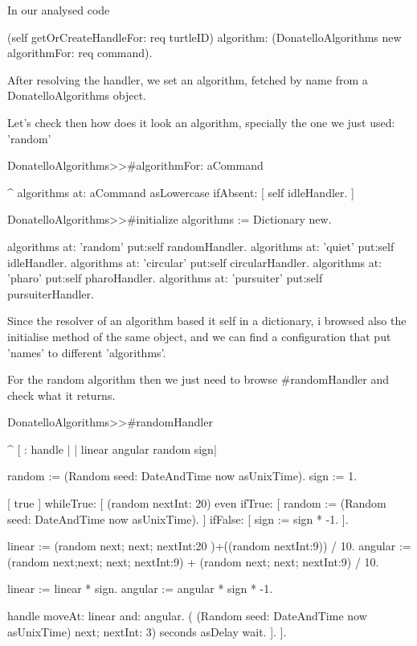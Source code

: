 \documentclass[a4paper,10pt,twoside]{book}
\begin{document}
			
			In our analysed code 
			
			\begin{code}
				(self getOrCreateHandleFor: req turtleID)  algorithm: (DonatelloAlgorithms new algorithmFor: req command).
			\end{code}
			
			After resolving the handler, we set an algorithm, fetched by name from a DonatelloAlgorithms object. 
			
			Let's check then how does it look an algorithm, specially the one we just used: 'random' 
			
			
			\begin{code}
DonatelloAlgorithms>>#algorithmFor: aCommand
	
	^ algorithms at: aCommand asLowercase  ifAbsent: [ 
		self idleHandler.	
	 ]

DonatelloAlgorithms>>#initialize
	algorithms := Dictionary new.
	
	algorithms at: 'random' put:self randomHandler.
	algorithms at: 'quiet' put:self idleHandler.
	algorithms at: 'circular' put:self circularHandler.
	algorithms at: 'pharo' put:self pharoHandler.
	algorithms at: 'pursuiter' put:self pursuiterHandler.
	
			\end{code}
			
			Since the resolver of an algorithm based it self in a dictionary, i browsed also the initialise method of the same object, and we can find a configuration that put 'names' to different 'algorithms'. 
			
			For the random algorithm then we just need to browse \#randomHandler and check what it returns. 
			
			
			\begin{code}
DonatelloAlgorithms>>#randomHandler

	^ [ : handle |
		| linear angular random sign|
		
		random := (Random seed: DateAndTime now asUnixTime).
		sign := 1.
		
		[ true ] whileTrue: [
			(random nextInt: 20) even ifTrue: [
				random := (Random seed: DateAndTime now asUnixTime).
			] ifFalse: [ 
				sign := sign * -1.
			 ].
			
			
			linear := (random next; next; nextInt:20 )+((random nextInt:9)) / 10.
			angular := (random next;next; next; nextInt:9) + (random  next; next; nextInt:9) / 10.
			
			linear := linear * sign. 
			angular := angular * sign * -1.
			
			handle moveAt: linear and: angular. 			
			( (Random seed: DateAndTime now asUnixTime) next; nextInt: 3) seconds asDelay wait.
		].
 	].
			\end{code}
			
\end{document}
